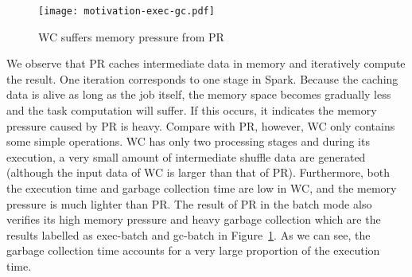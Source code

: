 \begin{figure}[!t]
\centering
\texttt{[image: motivation-exec-gc.pdf]}
\vspace{-2mm}
\caption{WC suffers memory pressure from PR}
\vspace{-6mm}
\label{fig:memorypressure}
\end{figure}

\begin{comment}
\begin{figure}[!t]
\centering
\subfigure[Execution Time]{
\label{fig:subfig:mot-exec}
\texttt{[image: motivation-exec.pdf]}}
\hspace{-1.3ex}
\subfigure[GC Time]{
\label{fig:subfig:mot-gc}
\texttt{[image: motivation-gc.pdf]}}
\label{fig:wc-result}
\vspace{-2mm}
\caption{The Impact of Memory Pressure}
\vspace{-2mm}
\end{figure}
\end{comment}


We observe that PR caches intermediate data in memory and iteratively compute the result. One iteration corresponds to one stage in Spark. Because the caching data is alive as long as the job itself, the memory space becomes gradually less and the task computation will suffer. If this occurs, it indicates the memory pressure caused by PR is heavy. Compare with PR, however, WC only contains some simple operations. WC has only two processing stages and during its execution, a very small amount of intermediate shuffle data are generated (although the input data of WC is larger than that of PR). Furthermore, both the execution time and garbage collection time are low in WC, and the memory pressure is much lighter than PR. The result of PR in the batch mode also verifies its high memory pressure and heavy garbage collection which are the results labelled as exec-batch and gc-batch in Figure~\ref{fig:memorypressure}. As we can see, the garbage collection time accounts for a very large proportion of the execution time.


